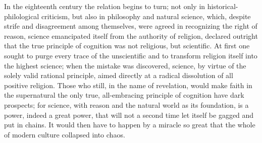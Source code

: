 \documentclass[12pt,a4paper]{article}
\begin{document}
In the eighteenth century the relation begins to turn;
not only in historical-philological criticism, but also in philosophy and
natural science, which, despite strife and disagreement among themselves, were agreed
in recognizing the right of reason, science emancipated itself
from the authority of religion, declared outright that the true principle
of cognition was not religious, but scientific. At first
one sought to purge every trace of the unscientific and to transform
religion itself into the highest science; when the mistake was
discovered, science, by virtue of the solely valid
rational principle, aimed directly at a radical dissolution of all positive
religion. Those who still, in the name of revelation, would make faith
in the supernatural the only true, all-embracing principle of
cognition have dark prospects; for science, with reason
and the natural world as its foundation, is a power, indeed a
great power, that will not a second time let itself be gagged and put in
chains. It would then have to happen by a miracle so great that the whole of
modern culture collapsed into chaos.
\end{document}
